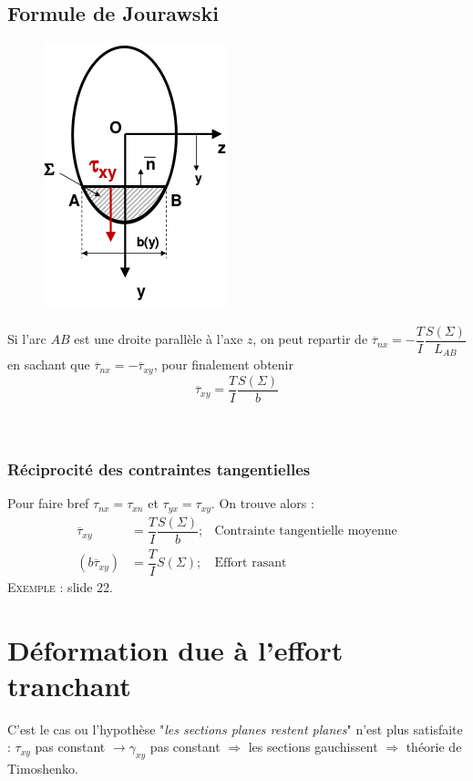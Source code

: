 	\subsection{Formule de Jourawski}
	\begin{figure}
	\vspace{-7mm}
	\includegraphics[scale=0.4]{ch5/image5.png}
	\end{figure}
	Si l'arc $AB$ est une droite parallèle à l'axe $z$, on peut repartir de 
	$\overline{\tau}_{nx} = -\dfrac{T}{I}\dfrac{S(\Sigma)}{L_{AB}}$ en sachant 
	que $\overline{\tau}_{nx} = -\overline{\tau}_{xy}$, pour finalement obtenir 
	\begin{equation}
	\overline{\tau}_{xy} = \dfrac{T}{I}\dfrac{S(\Sigma)}{b}
	\end{equation}\ \\\\
		
		\subsubsection{Réciprocité des contraintes tangentielles}
		Pour faire bref $\tau_{nx} = \tau_{xn}$ et $\tau_{yx}=\tau_{xy}$. On 
		trouve alors :
		\begin{equation}
		\begin{array}{lll}
		\overline{\tau}_{xy} &= \dfrac{T}{I}\dfrac{S(\Sigma)}{b}; & \text{Contrainte 
		tangentielle moyenne}\\
		(b\overline{\tau}_{xy}) &= \dfrac{T}{I}S(\Sigma); & \text{Effort rasant}
		\end{array}
		\end{equation}		
		\textsc{Exemple :} slide 22.
	
	
\section{Déformation due à l'effort tranchant}
C'est le cas ou l'hypothèse "\textit{les sections planes restent planes}" n'est plus 
satisfaite : $\tau_{xy}$ pas constant $\rightarrow \gamma_{xy}$ pas constant $\Rightarrow 
$ les sections gauchissent $\Rightarrow$ théorie de Timoshenko.
	
	
